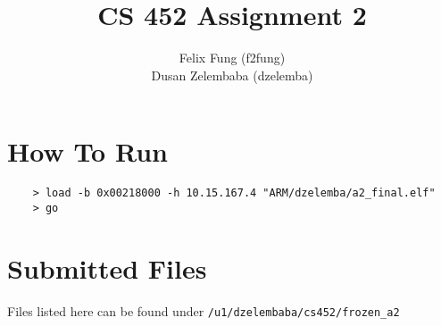 \documentclass[letterpaper]{article}
\begin{document}
\title{CS 452 Assignment 2}
\author{Felix Fung (f2fung) \\ Dusan Zelembaba (dzelemba)}
\maketitle

\section{How To Run}
\begin{verbatim}
	> load -b 0x00218000 -h 10.15.167.4 "ARM/dzelemba/a2_final.elf"
	> go
\end{verbatim}

\section{Submitted Files}

Files listed here can be found under \verb!/u1/dzelembaba/cs452/frozen_a2!
\end{document}
